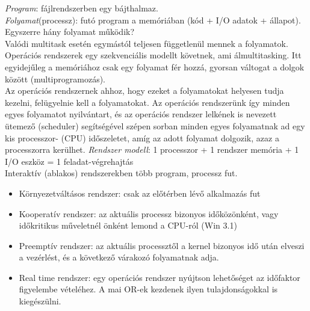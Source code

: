 \documentclass[margin=0px]{article}
\begin{document}
\textit{Program}: fájlrendszerben egy bájthalmaz. \\
\textit{Folyamat}(processz): futó program a memóriában (kód + I/O adatok + állapot). \\
Egyszerre hány folyamat működik? \\
Valódi multitask esetén egymástól teljesen függetlenül mennek a folyamatok. Operációs rendszerek egy szekvenciális modellt követnek, ami álmultitasking. Itt egyidejűleg a memóriához csak egy folyamat fér hozzá, gyorsan váltogat a dolgok között (multiprogramozás). \\
Az operációs rendszernek ahhoz, hogy ezeket a folyamatokat helyesen tudja kezelni, felügyelnie kell a folyamatokat. Az operációs rendszerünk így minden egyes folyamatot nyilvántart, és az operációs rendszer lelkének is nevezett ütemező (scheduler) segítségével szépen sorban minden egyes folyamatnak ad egy kis processzor- (CPU) időszeletet, amíg az adott folyamat dolgozik, azaz a processzorra kerülhet.
\textit{Rendszer modell}: 1 processzor + 1 rendszer memória + 1 I/O eszköz = 1 feladat-végrehajtás \\
Interaktív (ablakos) rendszerekben több program, processz fut.
\begin{itemize}
    \item Környezetváltásos rendszer: csak az előtérben lévő alkalmazás fut
    \item Kooperatív rendszer: az aktuális processz bizonyos időközönként, vagy időkritikus műveletnél önként lemond a CPU-ról (Win 3.1)
    \item Preemptív rendszer: az aktuális processztől a kernel bizonyos idő után elveszi a vezérlést, és a következő várakozó folyamatnak adja.
    \item Real time rendszer: egy operációs rendszer nyújtson lehetőséget az időfaktor figyelembe vételéhez. A mai OR-ek kezdenek ilyen tulajdonságokkal is kiegészülni.
\end{itemize}
\end{document}
